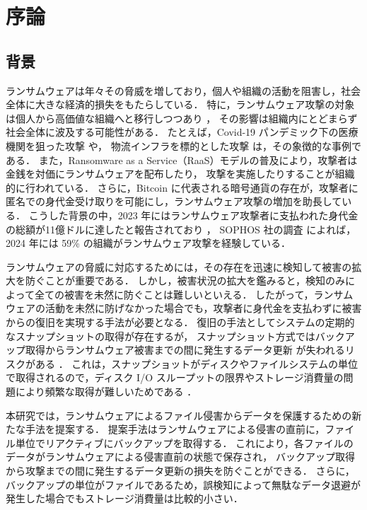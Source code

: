 \chapter{序論}
\section{背景}
ランサムウェアは年々その脅威を増しており，個人や組織の活動を阻害し，社会全体に大きな経済的損失をもたらしている．
特に，ランサムウェア攻撃の対象は個人から高価値な組織へと移行しつつあり \cite{sophos-report:online,early-detection}，
その影響は組織内にとどまらず社会全体に波及する可能性がある．
たとえば，Covid-19 パンデミック下の医療機関を狙った攻撃 \cite{Covid19R19:online} や，
物流インフラを標的とした攻撃 \cite{nagoya-port-attack} は，その象徴的な事例である．
また，Ransomware as a Service（RaaS）モデルの普及により，攻撃者は金銭を対価にランサムウェアを配布したり，
攻撃を実施したりすることが組織的に行われている．
さらに，Bitcoin に代表される暗号通貨の存在が，攻撃者に匿名での身代金受け取りを可能にし，ランサムウェア攻撃の増加を助長している．
こうした背景の中，2023 年にはランサムウェア攻撃者に支払われた身代金の総額が11億ドルに達したと報告されており \cite{Ransomwa86:online}，
SOPHOS 社の調査 \cite{sophos-report:online} によれば，2024 年には 59\% の組織がランサムウェア攻撃を経験している．

ランサムウェアの脅威に対応するためには，その存在を迅速に検知して被害の拡大を防ぐことが重要である．
しかし，被害状況の拡大を鑑みると，検知のみによって全ての被害を未然に防ぐことは難しいといえる．
したがって，ランサムウェアの活動を未然に防げなかった場合でも，攻撃者に身代金を支払わずに被害からの復旧を実現する手法が必要となる．
復旧の手法としてシステムの定期的なスナップショットの取得が存在するが，
スナップショット方式ではバックアップ取得からランサムウェア被害までの間に発生するデータ更新
が失われるリスクがある \cite{wang2024ransom}．
これは，スナップショットがディスクやファイルシステムの単位で取得されるので，ディスク I/O スループットの限界やストレージ消費量の問題により頻繁な取得が難しいためである
\cite{wang2024ransom, veena2021incremental}．

本研究では，ランサムウェアによるファイル侵害からデータを保護するための新たな手法を提案する．
提案手法はランサムウェアによる侵害の直前に，ファイル単位でリアクティブにバックアップを取得する．
これにより，各ファイルのデータがランサムウェアによる侵害直前の状態で保存され，
バックアップ取得から攻撃までの間に発生するデータ更新の損失を防ぐことができる．
さらに，バックアップの単位がファイルであるため，誤検知によって無駄なデータ退避が発生した場合でもストレージ消費量は比較的小さい．
